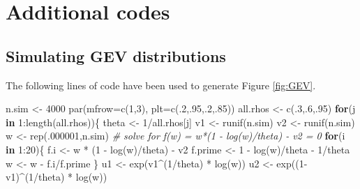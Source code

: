 \documentclass[
  12pt,
]{book}
\newenvironment{Shaded}{\begin{snugshade}}{\end{snugshade}}
\newcommand{\AttributeTok}[1]{\textcolor[rgb]{0.77,0.63,0.00}{#1}}
\newcommand{\CommentTok}[1]{\textcolor[rgb]{0.56,0.35,0.01}{\textit{#1}}}
\newcommand{\ControlFlowTok}[1]{\textcolor[rgb]{0.13,0.29,0.53}{\textbf{#1}}}
\newcommand{\DecValTok}[1]{\textcolor[rgb]{0.00,0.00,0.81}{#1}}
\newcommand{\FunctionTok}[1]{\textcolor[rgb]{0.00,0.00,0.00}{#1}}
\newcommand{\NormalTok}[1]{#1}
\newcommand{\OtherTok}[1]{\textcolor[rgb]{0.56,0.35,0.01}{#1}}
\newcommand{\SpecialCharTok}[1]{\textcolor[rgb]{0.00,0.00,0.00}{#1}}
\theoremstyle{definition}
\theoremstyle{definition}
\theoremstyle{definition}
\theoremstyle{definition}
\theoremstyle{remark}
\begin{document}
\hypertarget{additional-codes}{%
\section{Additional codes}\label{additional-codes}}

\hypertarget{App:GEV}{%
\subsection{Simulating GEV distributions}\label{App:GEV}}

The following lines of code have been used to generate Figure \ref{fig:GEV}.

\begin{Shaded}
\begin{Highlighting}[]
\NormalTok{n.sim }\OtherTok{\textless{}{-}} \DecValTok{4000}
\FunctionTok{par}\NormalTok{(}\AttributeTok{mfrow=}\FunctionTok{c}\NormalTok{(}\DecValTok{1}\NormalTok{,}\DecValTok{3}\NormalTok{),}
    \AttributeTok{plt=}\FunctionTok{c}\NormalTok{(.}\DecValTok{2}\NormalTok{,.}\DecValTok{95}\NormalTok{,.}\DecValTok{2}\NormalTok{,.}\DecValTok{85}\NormalTok{))}
\NormalTok{all.rhos }\OtherTok{\textless{}{-}} \FunctionTok{c}\NormalTok{(.}\DecValTok{3}\NormalTok{,.}\DecValTok{6}\NormalTok{,.}\DecValTok{95}\NormalTok{)}
\ControlFlowTok{for}\NormalTok{(j }\ControlFlowTok{in} \DecValTok{1}\SpecialCharTok{:}\FunctionTok{length}\NormalTok{(all.rhos))\{}
\NormalTok{  theta }\OtherTok{\textless{}{-}} \DecValTok{1}\SpecialCharTok{/}\NormalTok{all.rhos[j]}
\NormalTok{  v1 }\OtherTok{\textless{}{-}} \FunctionTok{runif}\NormalTok{(n.sim)}
\NormalTok{  v2 }\OtherTok{\textless{}{-}} \FunctionTok{runif}\NormalTok{(n.sim)}
\NormalTok{  w }\OtherTok{\textless{}{-}} \FunctionTok{rep}\NormalTok{(.}\DecValTok{000001}\NormalTok{,n.sim)}
  \CommentTok{\# solve for f(w) = w*(1 {-} log(w)/theta) {-} v2 = 0}
  \ControlFlowTok{for}\NormalTok{(i }\ControlFlowTok{in} \DecValTok{1}\SpecialCharTok{:}\DecValTok{20}\NormalTok{)\{}
\NormalTok{    f.i }\OtherTok{\textless{}{-}}\NormalTok{ w }\SpecialCharTok{*}\NormalTok{ (}\DecValTok{1} \SpecialCharTok{{-}} \FunctionTok{log}\NormalTok{(w)}\SpecialCharTok{/}\NormalTok{theta) }\SpecialCharTok{{-}}\NormalTok{ v2}
\NormalTok{    f.prime }\OtherTok{\textless{}{-}} \DecValTok{1} \SpecialCharTok{{-}} \FunctionTok{log}\NormalTok{(w)}\SpecialCharTok{/}\NormalTok{theta }\SpecialCharTok{{-}} \DecValTok{1}\SpecialCharTok{/}\NormalTok{theta}
\NormalTok{    w }\OtherTok{\textless{}{-}}\NormalTok{ w }\SpecialCharTok{{-}}\NormalTok{ f.i}\SpecialCharTok{/}\NormalTok{f.prime}
\NormalTok{  \}}
\NormalTok{  u1 }\OtherTok{\textless{}{-}} \FunctionTok{exp}\NormalTok{(v1}\SpecialCharTok{\^{}}\NormalTok{(}\DecValTok{1}\SpecialCharTok{/}\NormalTok{theta) }\SpecialCharTok{*} \FunctionTok{log}\NormalTok{(w))}
\NormalTok{  u2 }\OtherTok{\textless{}{-}} \FunctionTok{exp}\NormalTok{((}\DecValTok{1}\SpecialCharTok{{-}}\NormalTok{v1)}\SpecialCharTok{\^{}}\NormalTok{(}\DecValTok{1}\SpecialCharTok{/}\NormalTok{theta) }\SpecialCharTok{*} \FunctionTok{log}\NormalTok{(w))}


\end{Highlighting}
\end{Shaded}
\end{document}
